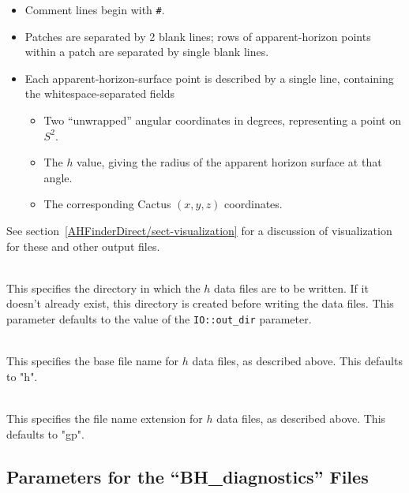 \begin{description}
\begin{description}
\begin{itemize}
\begin{itemize}
			\end{itemize}
		\item	Comment lines begin with \verb|#|.
		\item	Patches are separated by 2 blank lines;
			rows of apparent-horizon points within a patch
			are separated by single blank lines.
		\item	Each apparent-horizon-surface point
			is described by a single line, containing
			the whitespace-separated fields
			\begin{itemize}
			\item	Two ``unwrapped'' angular coordinates
				in degrees, representing a point on $S^2$.
			\item	The $h$ value, giving the radius
				of the apparent horizon surface
				at that angle.
			\item	The corresponding Cactus $(x,y,z)$
				coordinates.
			\end{itemize}
		\end{itemize}
		See section~\ref{AHFinderDirect/sect-visualization}
		for a discussion of visualization for these and other
		 output files.
	\end{description}

\item[\code{h\_directory}]
\mbox{}\\
	This specifies the directory in which the $h$ data files
	are to be written.  If it doesn't already exist, this directory
	is created before writing the data files.  This parameter
	defaults to the value of the \verb|IO::out_dir| parameter.

\item[\code{h\_base\_file\_name}]
\mbox{}\\
	This specifies the base file name for $h$ data files, as
	described above.  This defaults to "h".

\item[\code{ASCII\_gnuplot\_file\_name\_extension}]
\mbox{}\\
	This specifies the file name extension for $h$ data files, as
	described above.  This defaults to "gp".
\end{description}


\subsection{Parameters for the ``BH\_diagnostics'' Files}
\label{AHFinderDirect/sect-parameters/BH-diagnostics-parameters}

